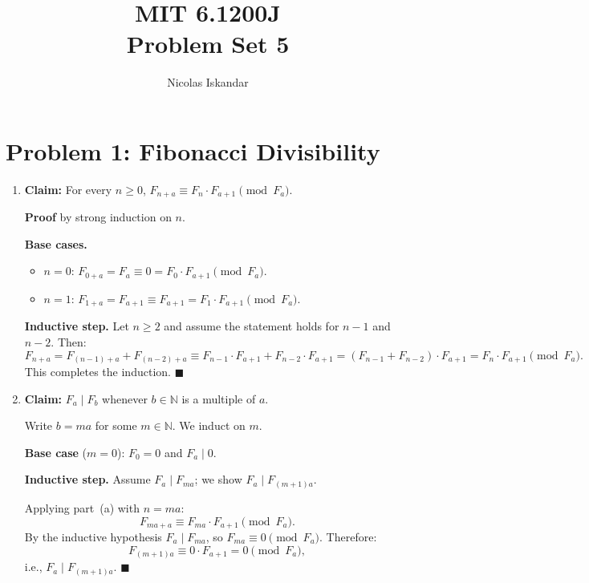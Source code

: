 \documentclass[11pt]{article}
\title{
    \vspace{-2em}
    MIT 6.1200J \\
    Problem Set 5
}
\author{Nicolas Iskandar}
\date{}
\begin{document}
\maketitle

\section*{Problem 1: Fibonacci Divisibility}
\begin{enumerate}[label=\textbf{(\alph*)}]

\item \textbf{Claim:} For every $n \geq 0$, $F_{n+a} \equiv F_n \cdot F_{a+1} \pmod{F_a}$.

\textbf{Proof} by strong induction on $n$.

\textbf{Base cases.}
\begin{itemize}
    \item $n = 0$: $F_{0+a} = F_a \equiv 0 = F_0 \cdot F_{a+1} \pmod{F_a}$. \checkmark
    \item $n = 1$: $F_{1+a} = F_{a+1} \equiv F_{a+1} = F_1 \cdot F_{a+1} \pmod{F_a}$. \checkmark
\end{itemize}

\textbf{Inductive step.} Let $n \geq 2$ and assume the statement holds for $n-1$ and $n-2$. Then:
\[
F_{n+a} = F_{(n-1)+a} + F_{(n-2)+a}
\equiv F_{n-1} \cdot F_{a+1} + F_{n-2} \cdot F_{a+1}
= (F_{n-1} + F_{n-2}) \cdot F_{a+1}
= F_n \cdot F_{a+1} \pmod{F_a}.
\]
This completes the induction. $\blacksquare$

\item \textbf{Claim:} $F_a \mid F_b$ whenever $b \in \mathbb{N}$ is a multiple of $a$.

Write $b = ma$ for some $m \in \mathbb{N}$. We induct on $m$.

\textbf{Base case} ($m = 0$): $F_0 = 0$ and $F_a \mid 0$. \checkmark

\textbf{Inductive step.} Assume $F_a \mid F_{ma}$; we show $F_a \mid F_{(m+1)a}$.

Applying part~(a) with $n = ma$:
\[
F_{ma + a} \equiv F_{ma} \cdot F_{a+1} \pmod{F_a}.
\]
By the inductive hypothesis $F_a \mid F_{ma}$, so $F_{ma} \equiv 0 \pmod{F_a}$. Therefore:
\[
F_{(m+1)a} \equiv 0 \cdot F_{a+1} = 0 \pmod{F_a},
\]
i.e., $F_a \mid F_{(m+1)a}$. $\blacksquare$

\end{enumerate}
\end{document}
